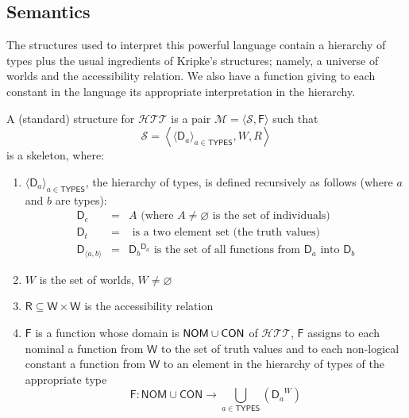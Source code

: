 \subsection{Semantics}

The structures used to interpret this powerful language contain a hierarchy
of types plus the usual ingredients of Kripke's structures; namely, a
universe of worlds and the accessibility relation. We also have a function
giving to each constant in the language its appropriate interpretation in the
hierarchy.

A (standard) structure for $\mathcal{HTT}$ is a pair 
$\mathcal{M}=\langle \mathcal{S},\mathsf{F}\rangle $ such that%
$$
\mathcal{S}=\left\langle \langle \mathsf{D}_{a}\rangle _{a\in \mathsf{TYPES}%
},W,R\right\rangle
$$
is a skeleton, where:

\begin{enumerate}
\item $\langle \mathsf{D}_{a}\rangle _{a\in \mathsf{TYPES}}$, the hierarchy
of types, is defined recursively as follows (where $a$ and $b$ are types):%
$$
\begin{array}{rcl}
\mathsf{D}_{e} & = & A\text{ (where }A\not=\varnothing \text{ is the set of
individuals)} \\ 
\mathsf{D}_{t} & = & \text{ is a two element set (the truth values)} \\ 
\mathsf{D}_{\langle a,b\rangle } & = & \mathsf{D}_{b}{}^{\mathsf{D}_{a}}%
\text{ is the set of all functions from }\mathsf{D}_{a}\text{ into }\mathsf{D%
}_{b}%
\end{array}%
$$

\item $W$ is the set of worlds, $W\not=\varnothing $

\item $\mathsf{R}\subseteq \mathsf{W}\times \mathsf{W}$ is the accessibility
relation

\item $\mathsf{F}$ is a function whose domain is $\mathsf{NOM}\cup \mathsf{%
CON}$ of $\mathcal{HTT}$, $\mathsf{F}$ assigns to each nominal a function
from $\mathsf{W}$ to the set of truth values and to each non-logical
constant a function from $\mathsf{W}$ to an element in the hierarchy of
types of the appropriate type 
\begin{equation*}
\mathsf{F}:\mathsf{NOM}\cup \mathsf{CON}\longrightarrow \bigcup\limits_{a\in 
\mathsf{TYPES}}\left( \left. \mathsf{D}_{a}\right. ^{W}\right)
\end{equation*}
\end{enumerate}

